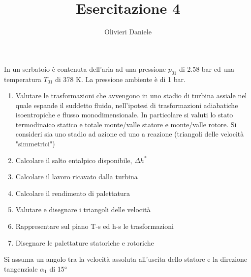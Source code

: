 \documentclass[a4paper,12pt]{article}
\title{Esercitazione 4}
\author{Olivieri Daniele}
\date{}
\begin{document}
\maketitle
In un serbatoio è contenuta dell'aria ad una pressione $p_01$ di 2.58 bar ed una temperatura $T_01$ di 378 K. La pressione ambiente è di 1 bar.
\begin{enumerate}
    \item Valutare le trasformazioni che avvengono in uno stadio di turbina assiale nel quale espande il suddetto fluido, nell'ipotesi
    di trasformazioni adiabatiche isoentropiche e flusso monodimensionale.
    In particolare si valuti lo stato termodinaico statico e totale monte/valle statore e monte/valle rotore. Si consideri sia uno stadio ad azione
    ed uno a reazione (triangoli delle velocità "simmetrici")    
    \item Calcolare il salto entalpico disponibile, $\Delta h^*$   
    \item Calcolare il lavoro ricavato dalla turbina
    \item Calcolare il rendimento di palettatura
    \item Valutare e disegnare i triangoli delle velocità
    \item Rappresentare sul piano T-s ed h-s le trasformazioni
    \item Disegnare le palettature statoriche e rotoriche
\end{enumerate}
Si assuma un angolo tra la velocità assoluta all'uscita dello statore e la direzione tangenziale $\alpha_1$ di 15°
\end{document}
